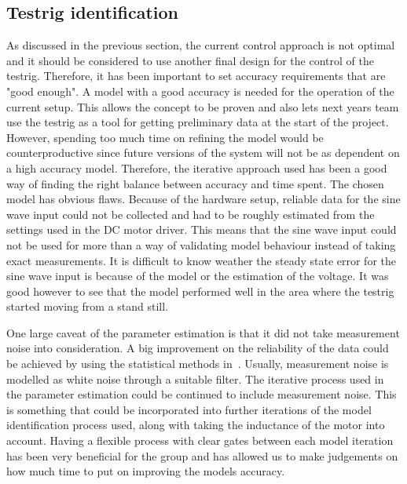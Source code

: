 
\subsection{Testrig identification}
As discussed in the previous section, the current control approach is not
optimal and it should be considered to use another final design for the control of the testrig. Therefore, it has been
important to set accuracy requirements that are "good enough". A model with a
good accuracy is needed for the operation of the current setup. This allows the
concept to be proven and also lets next years team use the testrig as a tool for
getting preliminary data at the start of the project. However, spending too much
time on refining the model would be counterproductive since future versions of
the system will not be as dependent on a high accuracy model. Therefore, the
iterative approach used has been a good way of finding the right balance between
accuracy and time spent. The chosen model has obvious flaws.  Because of the
hardware setup, reliable data for the sine wave input could not be collected and
had to be roughly estimated from the settings used in the DC motor driver. This
means that the sine wave input could not be used for more than a way of
validating model behaviour instead of taking exact measurements.  It is
difficult to know weather the steady state error for the sine wave input is
because of the model or the estimation of the voltage.  It was good however to
see that the model performed well in the area where the testrig started moving
from a stand still. 

One large caveat of the parameter estimation is that it did not take measurement
noise into consideration. A big improvement on the reliability of the data could
be achieved by using the statistical methods in~\cite{modeling1994}. Usually,
measurement noise is modelled as white noise through a suitable filter. The
iterative process used in the parameter estimation could be continued to include
measurement noise. This is something that could be incorporated into further
iterations of the model identification process used, along with taking the
inductance of the motor into account. Having a flexible process with clear gates
between each model iteration has been very beneficial for the group and has
allowed us to make judgements on how much time to put on improving the models
accuracy.

